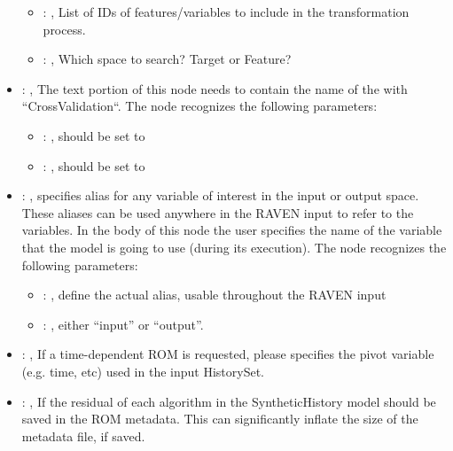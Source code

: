\begin{itemize}
\begin{itemize}
        \item {}: ,
          List of IDs of features/variables to include in the transformation process.

        \item {}: ,
          Which space to search? Target or Feature?
      \end{itemize}

    \item {}: ,
      The text portion of this node needs to contain the name of the  with
               ``CrossValidation``.
      The  node recognizes the following parameters:
        \begin{itemize}
          \item {}: ,
            should be set to 
          \item {}: ,
            should be set to 
      \end{itemize}

    \item {}: ,
      specifies alias for         any variable of interest in the input or output space. These
      aliases can be used anywhere in the RAVEN input to         refer to the variables. In the body
      of this node the user specifies the name of the variable that the model is going to use
      (during its execution).
      The  node recognizes the following parameters:
        \begin{itemize}
          \item {}: ,
            define the actual alias, usable throughout the RAVEN input
          \item {}: ,
            either ``input'' or ``output''.
      \end{itemize}

    \item {}: ,
      If a time-dependent ROM is requested, please specifies the pivot         variable (e.g. time,
      etc) used in the input HistorySet.

    \item {}: ,
      If the residual of each algorithm in the SyntheticHistory model should be saved in the ROM
      metadata. This can significantly inflate the size of the metadata file, if saved.


\end{itemize}
